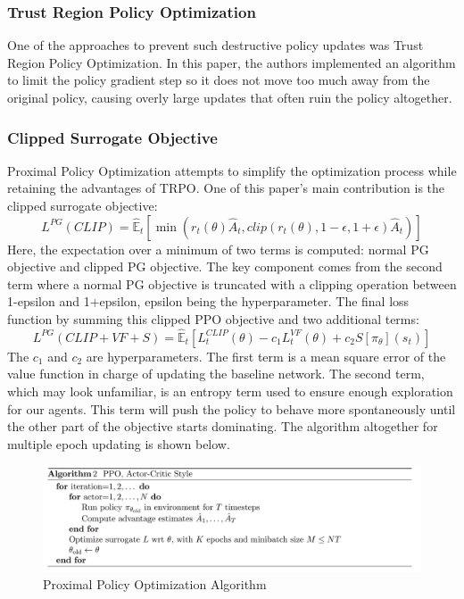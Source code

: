 \documentclass[conference]{IEEEtran}
\begin{document}
\subsubsection{Trust Region Policy Optimization}
One of the approaches to prevent such destructive policy updates was Trust Region Policy Optimization\cite{https://doi.org/10.48550/arxiv.1502.05477}.
In this paper, the authors implemented an algorithm to limit the policy gradient step so it does not move too much away from the original policy, causing overly large updates that often ruin the policy altogether.
\subsubsection{Clipped Surrogate Objective}
Proximal Policy Optimization attempts to simplify the optimization process while retaining the advantages of TRPO.
One of this paper's main contribution is the clipped surrogate objective:
\begin{equation}
    {L}^{PG}(CLIP) = {\hat{\mathbb{E}}}_{t}[\min({r}_{t}(\theta)\hat{A}_{t},clip({r}_{t}(\theta), 1-\epsilon, 1+\epsilon)\hat{A}_{t})]
\end{equation}
Here, the expectation over a minimum of two terms is computed: normal PG objective and clipped PG objective. The key component comes from the second term where a normal PG objective is truncated with a clipping operation between 1-epsilon and 1+epsilon, epsilon being the hyperparameter.
The final loss function by summing this clipped PPO objective and two additional terms:
\begin{equation}
    {L}^{PG}(CLIP+VF+S) = {\hat{\mathbb{E}}}_{t}[L^{CLIP}_{t}(\theta) - c_{1}L^{VF}_{t}(\theta) + c_{2}S[\pi_{\theta}](s_{t})]
\end{equation}
The $c_{1}$ and $c_{2}$ are hyperparameters. The first term is a mean square error of the value function in charge of updating the baseline network. The second term, which may look unfamiliar, is an entropy term used to ensure enough exploration for our agents. This term will push the policy to behave more spontaneously until the other part of the objective starts dominating.
The algorithm altogether for multiple epoch updating is shown below.

\begin{figure}[htbp]
\centerline{\includegraphics[width=1.0\linewidth]{images/ppo_algorithm.png}}
\caption{Proximal Policy Optimization Algorithm}
\label{fig6}
\end{figure}
\end{document}
